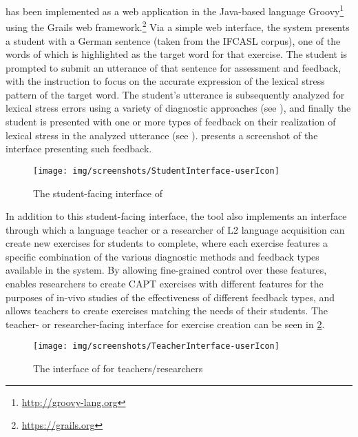  has been 
implemented as a web application in the Java-based language Groovy\footnote{\url{http://groovy-lang.org}} using the Grails web framework.\footnote{\url{https://grails.org}} Via a simple web interface, the system presents a student with a German sentence (taken from the IFCASL corpus), one of the words of which is highlighted as the target word for that exercise. The student is prompted to submit an utterance of that sentence for assessment and feedback, with the instruction to focus on the accurate expression of the lexical stress pattern of the target word. The student's utterance is subsequently analyzed for lexical stress errors using a variety of diagnostic approaches (see ), and finally the student is presented with one or more types of feedback on their realization of lexical stress in the analyzed utterance (see ).  presents a screenshot of the interface presenting such feedback.

	\begin{figure}
		\centering
		\caption{The student-facing interface of }
		\texttt{[image: img/screenshots/StudentInterface-userIcon]}
		\label{fig:interface:student}
	\end{figure}

In addition to this student-facing interface, the tool also implements an interface through which a language teacher or a researcher of L2 language acquisition can create new exercises for students to complete, where each exercise features a specific combination of the various diagnostic methods and feedback types available in the system. By allowing fine-grained control over these features,  enables researchers to create CAPT exercises with different features for the purposes of in-vivo studies of the effectiveness of different feedback types, and allows teachers to create exercises matching the needs of their students. The teacher- or researcher-facing interface for exercise creation can be seen in \cref{fig:interface:teacher}.

	\begin{figure}
		\centering
		\caption{The interface of  for teachers/researchers}
		\texttt{[image: img/screenshots/TeacherInterface-userIcon]}
		\label{fig:interface:teacher}
	\end{figure}


